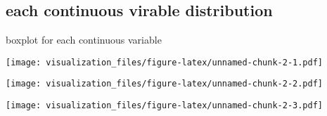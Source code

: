 \documentclass[
]{article}
\newenvironment{Shaded}{\begin{snugshade}}{\end{snugshade}}
\newcommand{\AttributeTok}[1]{\textcolor[rgb]{0.77,0.63,0.00}{#1}}
\newcommand{\FunctionTok}[1]{\textcolor[rgb]{0.00,0.00,0.00}{#1}}
\newcommand{\NormalTok}[1]{#1}
\newcommand{\SpecialCharTok}[1]{\textcolor[rgb]{0.00,0.00,0.00}{#1}}
\newcommand{\StringTok}[1]{\textcolor[rgb]{0.31,0.60,0.02}{#1}}
\begin{document}
\hypertarget{each-continuous-virable-distribution}{%
\subsection{each continuous virable
distribution}\label{each-continuous-virable-distribution}}

boxplot for each continuous variable

\begin{Shaded}
\end{Shaded}

\texttt{[image: visualization\_files/figure-latex/unnamed-chunk-2-1.pdf]}

\begin{Shaded}
\end{Shaded}

\texttt{[image: visualization\_files/figure-latex/unnamed-chunk-2-2.pdf]}

\begin{Shaded}
\end{Shaded}

\texttt{[image: visualization\_files/figure-latex/unnamed-chunk-2-3.pdf]}

\begin{Shaded}
\end{Shaded}
\end{document}
